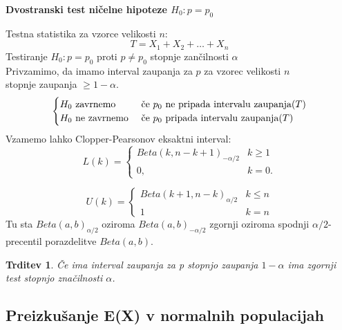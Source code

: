 \documentclass[11pt]{article}
\newtheorem{Trditev}[Izrek]{{\sc Trditev}}
\begin{document}
			\begin{framed}
			\begin{center}
				\textbf{Dvostranski test ničelne hipoteze $H_0: p = p_0$}
			\end{center}
			Testna statistika za vzorce velikosti $n$:
			$$T = X_1 + X_2 +\ldots + X_n$$
			Testiranje $H_0: p= p_0$ proti $p \ne p_0$ stopnje zančilnosti $\alpha$
			\\
			Privzamimo, da imamo interval zaupanja za $p$ za vzorec velikosti $n$ 
			\\ stopnje zaupanja $\ge 1-\alpha$.
			\[
			\begin{cases}
			H_0 \textnormal{ zavrnemo } & \textnormal{če $p_0$ ne pripada intervalu zaupanja}(T)\\
			H_0 \textnormal{ ne zavrnemo } & \textnormal{če $p_0$ pripada intervalu zaupanja}(T)
			\end{cases}
			\]
			Vzamemo lahko Clopper-Pearsonov eksaktni interval:
			\[
			L(k)= 
			\begin{cases}
			Beta(k, n-k+1)_{-\alpha/2} & k\ge 1\\
			0,              & k = 0.
			\end{cases}
			\]
			
			\[
			U(k)= 
			\begin{cases}
			Beta(k+1, n-k)_{\alpha/2}& k\le n\\
			1             & k=n
			\end{cases}
			\]
			Tu sta $Beta(a,b)_{\alpha/2}$ oziroma $Beta(a,b)_{-\alpha/2}$ zgornji oziroma spodnji $\alpha/2$-precentil porazdelitve $Beta(a,b)$.
			\end{framed}
		\begin{Trditev}
			Če ima interval zaupanja za p stopnjo zaupanja $1-\alpha$ ima zgornji test stopnjo značilnosti $\alpha$.
		\end{Trditev}
\subsection{Preizkušanje E(X) v normalnih populacijah}
\end{document}
